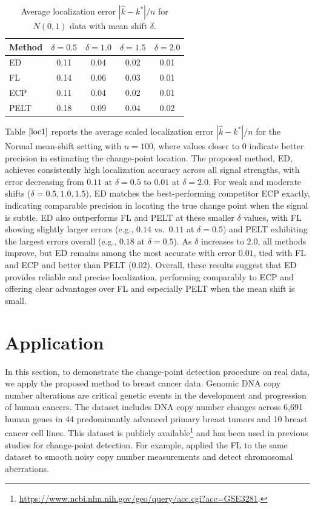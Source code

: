 \documentclass[11pt]{article}
\numberwithin{theorem}{section}
\numberwithin{Lemma}{section}
\numberwithin{Definition}{section}
\begin{document}
{\setlength{\tabcolsep}{1em}
\begin{table}[H]
\caption{Average localization error $|\hat{k} - k^*|/n$ for $N(0,1)$ data with mean shift $\delta$.}
\centering
\begin{tabular}{lcccc}
\hline
Method & $\delta=0.5$ & $\delta=1.0$ & $\delta=1.5$ & $\delta=2.0$ \\
\hline
ED  & 0.11 & 0.04 & 0.02 & 0.01 \\
FL & 0.14 & 0.06 & 0.03 & 0.01 \\
ECP & 0.11 & 0.04 & 0.02 & 0.01 \\
PELT & 0.18 & 0.09 & 0.04 & 0.02 \\
\hline
\end{tabular}
\label{loc1}
\end{table}}

Table $\ref{loc1}$ reports the average scaled localization error $|\hat{k}-k^*|/n$ for the Normal mean-shift setting with $n=100$, where values closer to $0$ indicate better precision in estimating the change-point location. The proposed method, ED, achieves consistently high localization accuracy across all signal strengths, with error decreasing from $0.11$ at $\delta=0.5$ to $0.01$ at $\delta=2.0$. For weak and moderate shifts ($\delta=0.5,1.0,1.5$), ED matches the best-performing competitor ECP exactly, indicating comparable precision in locating the true change point when the signal is subtle. ED also outperforms FL and PELT at these smaller $\delta$ values, with FL showing slightly larger errors (e.g., $0.14$ vs.\ $0.11$ at $\delta=0.5$) and PELT exhibiting the largest errors overall (e.g., $0.18$ at $\delta=0.5$). As $\delta$ increases to $2.0$, all methods improve, but ED remains among the most accurate with error $0.01$, tied with FL and ECP and better than PELT ($0.02$). Overall, these results suggest that ED provides reliable and precise localization, performing comparably to ECP and offering clear advantages over FL and especially PELT when the mean shift is small.


\section{Application}

\sloppy In this section, to demonstrate the change-point detection procedure on real data, we apply the proposed method to breast cancer data. Genomic DNA copy number alterations are critical genetic events in the development and progression of human cancers. The dataset includes DNA copy number changes across 6,691 human genes in 44 predominantly advanced primary breast tumors and 10 breast cancer cell lines. This dataset is publicly available\footnote{\url{https://www.ncbi.nlm.nih.gov/geo/query/acc.cgi?acc=GSE3281}.} and has been used in previous studies for change-point detection. For example, \cite{tib2008} applied the FL to the same dataset to smooth noisy copy number measurements and detect chromosomal aberrations. \\
\end{document}
